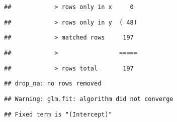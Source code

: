 \documentclass[
]{article}
\begin{document}
\begin{verbatim}
##            > rows only in x     0
\end{verbatim}

\begin{verbatim}
##            > rows only in y  ( 48)
\end{verbatim}

\begin{verbatim}
##            > matched rows     197
\end{verbatim}

\begin{verbatim}
##            >                 =====
\end{verbatim}

\begin{verbatim}
##            > rows total       197
\end{verbatim}

\begin{verbatim}
## drop_na: no rows removed
\end{verbatim}

\begin{verbatim}
## Warning: glm.fit: algorithm did not converge
\end{verbatim}

\begin{verbatim}
## Fixed term is "(Intercept)"
\end{verbatim}
\end{document}
